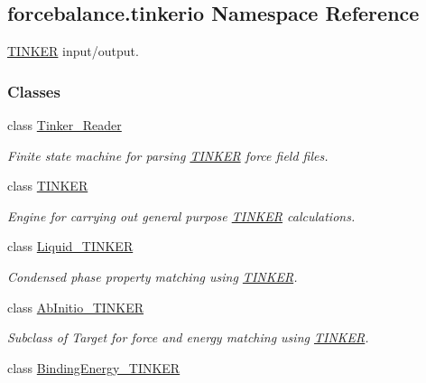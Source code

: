 \hypertarget{namespaceforcebalance_1_1tinkerio}{\subsection{forcebalance.\-tinkerio Namespace Reference}
\label{namespaceforcebalance_1_1tinkerio}
}


\hyperlink{classforcebalance_1_1tinkerio_1_1TINKER}{T\-I\-N\-K\-E\-R} input/output.  


\subsubsection*{Classes}
\begin{DoxyCompactItemize}
\item 
class \hyperlink{classforcebalance_1_1tinkerio_1_1Tinker__Reader}{Tinker\-\_\-\-Reader}
\begin{DoxyCompactList}\small\item\em Finite state machine for parsing \hyperlink{classforcebalance_1_1tinkerio_1_1TINKER}{T\-I\-N\-K\-E\-R} force field files. \end{DoxyCompactList}\item 
class \hyperlink{classforcebalance_1_1tinkerio_1_1TINKER}{T\-I\-N\-K\-E\-R}
\begin{DoxyCompactList}\small\item\em Engine for carrying out general purpose \hyperlink{classforcebalance_1_1tinkerio_1_1TINKER}{T\-I\-N\-K\-E\-R} calculations. \end{DoxyCompactList}\item 
class \hyperlink{classforcebalance_1_1tinkerio_1_1Liquid__TINKER}{Liquid\-\_\-\-T\-I\-N\-K\-E\-R}
\begin{DoxyCompactList}\small\item\em Condensed phase property matching using \hyperlink{classforcebalance_1_1tinkerio_1_1TINKER}{T\-I\-N\-K\-E\-R}. \end{DoxyCompactList}\item 
class \hyperlink{classforcebalance_1_1tinkerio_1_1AbInitio__TINKER}{Ab\-Initio\-\_\-\-T\-I\-N\-K\-E\-R}
\begin{DoxyCompactList}\small\item\em Subclass of Target for force and energy matching using \hyperlink{classforcebalance_1_1tinkerio_1_1TINKER}{T\-I\-N\-K\-E\-R}. \end{DoxyCompactList}\item 
class \hyperlink{classforcebalance_1_1tinkerio_1_1BindingEnergy__TINKER}{Binding\-Energy\-\_\-\-T\-I\-N\-K\-E\-R}

\end{DoxyCompactItemize}
